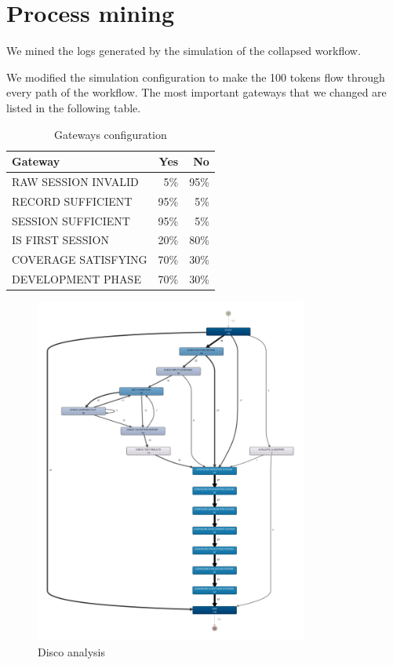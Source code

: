 \section{Process mining}
\label{sec:process_mining}

We mined the logs generated by the simulation of the collapsed workflow.

We modified the simulation configuration to make the 100 tokens
flow through every path of the workflow. The most important gateways that we
changed are listed in the following table.
\begin{table}[H]
\centering
\begin{tabular}{|l|r|r|}
\hline
\textbf{Gateway} & \textbf{Yes} & \textbf{No} \\
\hline
RAW SESSION INVALID & 5\% & 95\% \\
\hline
RECORD SUFFICIENT & 95\% & 5\% \\
\hline
SESSION SUFFICIENT & 95\% & 5\% \\
\hline
IS FIRST SESSION & 20\% & 80\% \\
\hline
COVERAGE SATISFYING & 70\% & 30\% \\
\hline
DEVELOPMENT PHASE & 70\% & 30\% \\
\hline
\end{tabular}
\caption{Gateways configuration}
\label{tab:gateways_configuration}
\end{table}

\begin{figure}[H]
\centering
\includegraphics[width=0.8\textwidth]{figures/disco_map.pdf}
\caption{Disco analysis}
\label{fig:disco_analysis}
\end{figure}


